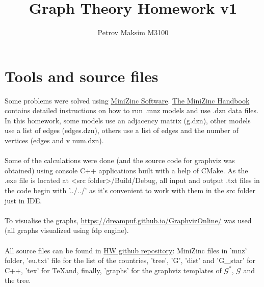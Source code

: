 \documentclass{article}
\title{\fontfamily{bch}\selectfont\Huge Graph Theory Homework v1}
\author{\Large Petrov Maksim M3100}
\begin{document}
	\fontsize{14pt}{16pt}\selectfont
	\maketitle
	
	\section*{Tools and source files}
	Some problems were solved using \href{https://www.minizinc.org/software.html}{MiniZinc Software}. \href{https://www.minizinc.org/doc-2.7.0/en/index.html}{The MiniZinc Handbook} contains detailed instructions on how to run .mnz models and use .dzn data files. In this homework, some models use an adjacency matrix (g.dzn), other models use a list of edges (edges.dzn), others use a list of edges and the number of vertices (edges and v num.dzn). \\\\
	Some of the calculations were done (and the source code for graphviz was obtained) using console C++ applications built with a help of CMake. As the .exe file is located at {\textless}src folder{\textgreater}/Build/Debug, all input and output .txt files in the code begin with '../../' as it's convenient to work with them in the src folder just in IDE.\\\\
	To visualise the graphs, \url{https://dreampuf.github.io/GraphvizOnline/} was used (all graphs visualized using fdp engine).\\\\
	All source files can be found in \href{https://github.com/fish-from-SanDiego/GraphTheoryHW}{HW github repository}:
	MiniZinc files in 'mnz' folder, 'eu.txt' file for the list of the countries, 'tree', 'G', 'dist' and 'G\textbf{\_}star' for C++, 'tex' for \TeX and, finally, 'graphs' for the graphviz templates of $\mathcal{G}^*$, $\mathcal{G}$ and the tree.
	\newpage
\end{document}
